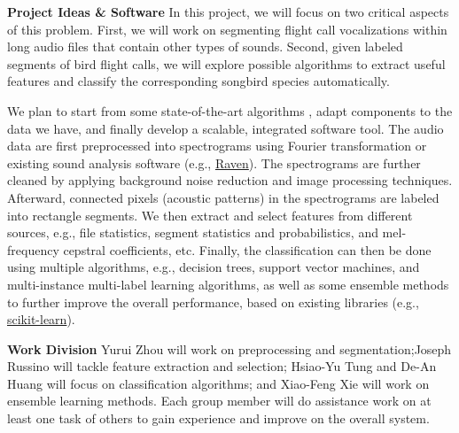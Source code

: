 \documentclass{article} %
\begin{document}

{\bf Project Ideas \& Software} In this project, we will focus on two critical aspects of this problem. First, we will work on segmenting flight call vocalizations within long audio files that contain other types of sounds. Second, given labeled segments of bird flight calls, we will explore possible algorithms to extract useful features and classify the corresponding songbird species automatically.


We plan to start from some state-of-the-art algorithms \cite{briggs2013instance,Lasseck13,Massaron13,stattnersong13}, adapt components to the data we have, and finally develop a scalable, integrated software tool.
The audio data are first preprocessed into spectrograms using Fourier transformation or existing sound analysis software (e.g., \href{http://www.birds.cornell.edu/brp/raven/}{Raven}). The spectrograms are further cleaned by applying background noise reduction and image processing techniques. Afterward, connected pixels (acoustic patterns) in the spectrograms are labeled into rectangle segments.  We then extract and select features from different sources, e.g., file statistics, segment statistics and probabilistics, and mel-frequency cepstral coefficients, etc. Finally, the classification can then be done using multiple algorithms, e.g., decision trees, support vector machines, and multi-instance multi-label learning algorithms, as well as some ensemble methods to further improve the overall performance, based on existing libraries (e.g., \href{http://scikit-learn.org}{scikit-learn}). %

{\bf Work Division} Yurui Zhou will work on preprocessing and segmentation;Joseph Russino will tackle feature extraction and selection; Hsiao-Yu Tung and De-An Huang will focus on classification algorithms; and Xiao-Feng Xie will work on ensemble learning methods. Each group member will do assistance work on at least one task of others to gain experience and improve on the overall system.  
\end{document}
